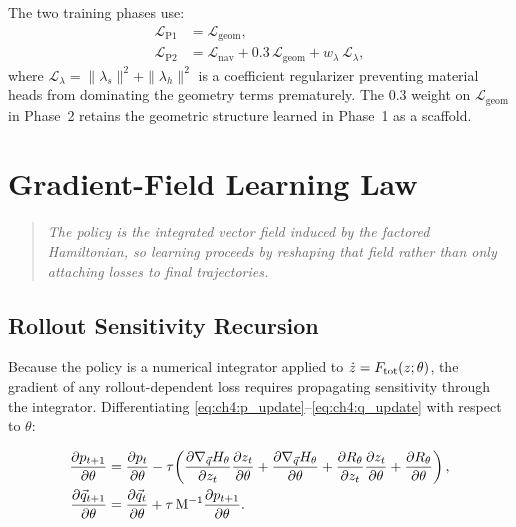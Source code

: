 The two training phases use:
\begin{align}
  \mathcal{L}_{\mathrm{P1}}
  &= \mathcal{L}_{\mathrm{geom}},
  \label{eq:ch4:LP1} \\
  \mathcal{L}_{\mathrm{P2}}
  &= \mathcal{L}_{\mathrm{nav}}
    + 0.3\,\mathcal{L}_{\mathrm{geom}}
    + w_\lambda\,\mathcal{L}_\lambda,
  \label{eq:ch4:LP2}
\end{align}
where $\mathcal{L}_\lambda = \|\lambda_s\|^2 + \|\lambda_h\|^2$ is a
coefficient regularizer preventing material heads from dominating the
geometry terms prematurely.
The $0.3$ weight on $\mathcal{L}_{\mathrm{geom}}$ in Phase~2 retains
the geometric structure learned in Phase~1 as a scaffold.

\section{Gradient-Field Learning Law}
\label{sec:ch4:gradients}

\begin{quote}\itshape
The policy is the integrated vector field induced by the factored
Hamiltonian, so learning proceeds by reshaping that field rather than
only attaching losses to final trajectories.
\end{quote}

\subsection{Rollout Sensitivity Recursion}
\label{subsec:ch4:sensitivity}

Because the policy is a numerical integrator applied to
$\dot{z} = F_{\mathrm{tot}}(z;\theta)$,
the gradient of any rollout-dependent loss requires propagating
sensitivity through the integrator.
Differentiating \eqref{eq:ch4:p_update}--\eqref{eq:ch4:q_update}
with respect to $\theta$:

\begin{align}
  \frac{\partial p_{t+1}}{\partial\theta}
  &= \frac{\partial p_t}{\partial\theta}
  - \tau\!\left(
      \frac{\partial \nabla_{\vec{q}} H_\theta}{\partial z_t}
      \frac{\partial z_t}{\partial\theta}
      + \frac{\partial \nabla_{\vec{q}} H_\theta}{\partial\theta}
      + \frac{\partial R_\theta}{\partial z_t}
        \frac{\partial z_t}{\partial\theta}
      + \frac{\partial R_\theta}{\partial\theta}
    \right),
  \label{eq:ch4:dp_dtheta} \\
  \frac{\partial \vec{q}_{t+1}}{\partial\theta}
  &= \frac{\partial \vec{q}_t}{\partial\theta}
  + \tau\,\mathrm{M}^{-1}\frac{\partial p_{t+1}}{\partial\theta}.
  \label{eq:ch4:dq_dtheta}
\end{align}

